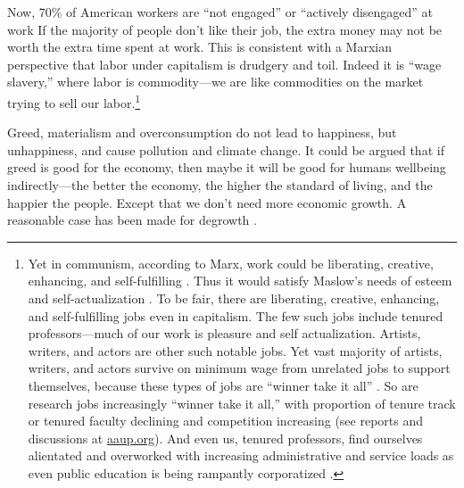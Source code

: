 \documentclass[10pt, letterpaper]{article}
\begin{document}
\begin{spacing}{1.8}
Now, 70\% of American workers are ``not engaged'' or ``actively disengaged'' at work \citep[][]{harvey14}
If the majority of people don't like their job, the extra money may not be worth
the extra time spent at work. This is consistent with a Marxian perspective that
labor under capitalism is drudgery and toil. Indeed it is ``wage slavery,''
where labor is commodity---we are like commodities on the market trying to sell
our labor.\footnote{Yet in communism, according to Marx, work could be
  liberating, creative, enhancing, and self-fulfilling \citep{spencer20}. Thus
  it would satisfy Maslow's needs of esteem and self-actualization
  \citep{maslow87}. 
%
   To be fair, there are liberating, creative, enhancing, and
  self-fulfilling jobs even in capitalism. The few such jobs include tenured professors---much
of our work is pleasure and self actualization. %
Artists, writers, and actors are other such notable jobs. Yet vast majority of
artists, writers, and actors survive on minimum wage from unrelated jobs to support
themselves, because these types of jobs are ``winner take it all''
\citep{frank12}. So are research jobs increasingly ``winner take it all,'' with
proportion of tenure track or tenured faculty declining and competition
increasing (see reports and discussions at \url{aaup.org}).
 And even us, tenured professors, find ourselves alientated and overworked with
 increasing administrative and service loads as even public education is being rampantly corporatized \citep{mills2012corporatization,cox2013corporatization,millsNYT12fa,CatropaNYT20feb8,schmidlinNYT15oct10}.

} 

Greed, materialism and overconsumption do not lead to happiness, but unhappiness, and cause pollution and climate change\citep{leonard10,pachauri14}.
 It could be argued that if greed is good for the economy, then maybe it will be
 good for humans wellbeing indirectly---the better the economy, the higher the
 standard of living, and the happier the people. Except that we don't need more
 economic growth. A reasonable case has been made for degrowth \cite{kallis12,kallis11,bergh11}.
 

\end{spacing}
\end{document}
